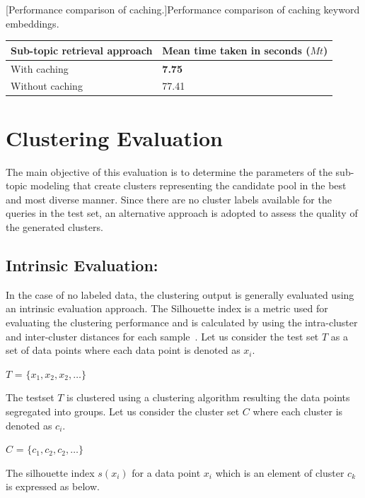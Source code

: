 \begin{center}
	[Performance comparison of caching.]{Performance comparison of caching keyword embeddings.}\label{tab:cache_comparision}
	\begin{tabularx}{0.77\textwidth}{|Y|Y|}
		\hline
		 Sub-topic retrieval approach &  Mean time taken in seconds ($Mt$) \\
		\hline
	 With caching & \textbf{7.75} \\
		\hline
	 Without caching & 77.41 \\
		\hline
	\end{tabularx}
\end{center}


\section{Clustering Evaluation}

The main objective of this evaluation is to determine the parameters of the sub-topic modeling that create clusters representing the candidate pool in the best and most diverse manner. Since there are no cluster labels available for the queries in the test set, an alternative approach is adopted to assess the quality of the generated clusters.

	
	\subsection{Intrinsic Evaluation:} In the case of no labeled data, the clustering output is generally evaluated using an intrinsic evaluation approach. The Silhouette index is a metric used for evaluating the clustering performance and is calculated by using the intra-cluster and inter-cluster distances for each sample~\cite{rousseeuw1987silhouettes, shutaywi2021silhouette}. Let us consider the test set $T$ as a set of data points where each data point is denoted as $x_i$.
		
		\centerline{$T$ = $\{x_1, x_2, x_2,\dots\}$}
		
		The testset $T$ is clustered using a clustering algorithm resulting the data points segregated into groups. Let us consider the cluster set $C$ where each cluster is denoted as $c_i$.
		
		\centerline{$C$ = $\{c_1, c_2, c_2,\dots\}$}
		
		The silhouette index $s(x_i)$ for a data point $x_i$ which is an element of cluster $c_k$ is expressed as below.\\
		
